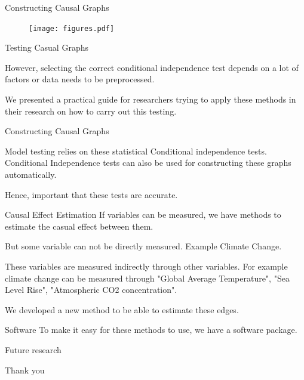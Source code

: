 \documentclass[aspectratio=169]{beamer}
\begin{document}
\begin{frame}{Constructing Causal Graphs}

\begin{figure}
	\texttt{[image: figures.pdf]}
\end{figure}

	
\end{frame}

\begin{frame}{Testing Casual Graphs}

	However, selecting the correct conditional independence test depends on a lot of factors or data needs to be preprocessed.

	We presented a practical guide for researchers trying to apply these methods in their research on how to carry out this testing.
\end{frame}

\begin{frame}{Constructing Causal Graphs}

	Model testing relies on these statistical Conditional independence tests.
	Conditional Independence tests can also be used for constructing these graphs
	automatically.

	Hence, important that these tests are accurate.
\end{frame}

\begin{frame}{Causal Effect Estimation}
	If variables can be measured, we have methods to estimate the casual effect between them.

	But some variable can not be directly measured. Example Climate Change.

	These variables are measured indirectly through other variables. For example climate change can be measured through "Global Average Temperature", "Sea Level Rise", "Atmospheric CO2 concentration".

	We developed a new method to be able to estimate these edges.
\end{frame}

\begin{frame}{Software}
	To make it easy for these methods to use, we have a software package.
\end{frame}

\begin{frame}{Future research}	
\end{frame}

\begin{frame}
	\Huge{Thank you}
\end{frame}
\end{document}
